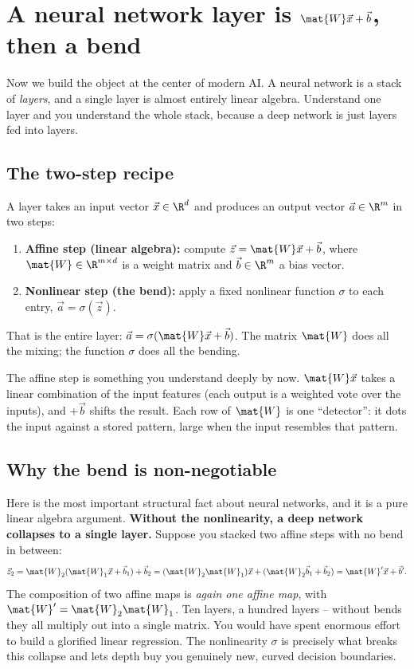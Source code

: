 \section{A neural network layer is $\mat{W}\vec{x}+\vec{b}$, then a bend}
\label{ch34:nnlayer}

Now we build the object at the center of modern AI. A neural network is a stack of
\emph{layers}, and a single layer is almost entirely linear algebra. Understand one
layer and you understand the whole stack, because a deep network is just layers fed into
layers.

\subsection{The two-step recipe}

A layer takes an input vector $\vec{x}\in\R^{d}$ and produces an output vector
$\vec{a}\in\R^{m}$ in two steps:
\begin{enumerate}
  \item \textbf{Affine step (linear algebra):} compute $\vec{z} = \mat{W}\vec{x} +
  \vec{b}$, where $\mat{W}\in\R^{m\times d}$ is a weight matrix and $\vec{b}\in\R^{m}$ a
  bias vector.
  \item \textbf{Nonlinear step (the bend):} apply a fixed nonlinear function $\sigma$ to
  each entry, $\vec{a} = \sigma(\vec{z})$.
\end{enumerate}
That is the entire layer: $\vec{a} = \sigma(\mat{W}\vec{x}+\vec{b})$. The matrix $\mat{W}$
does all the mixing; the function $\sigma$ does all the bending.

The affine step is something you understand deeply by now. $\mat{W}\vec{x}$ takes a
linear combination of the input features (each output is a weighted vote over the inputs),
and $+\vec{b}$ shifts the result. Each row of $\mat{W}$ is one ``detector'': it dots the
input against a stored pattern, large when the input resembles that pattern.

\subsection{Why the bend is non-negotiable}

Here is the most important structural fact about neural networks, and it is a pure linear
algebra argument. \textbf{Without the nonlinearity, a deep network collapses to a single
layer.} Suppose you stacked two affine steps with no bend in between:
\[
\vec{z}_2 = \mat{W}_2(\mat{W}_1 \vec{x} + \vec{b}_1) + \vec{b}_2
= (\mat{W}_2\mat{W}_1)\vec{x} + (\mat{W}_2\vec{b}_1 + \vec{b}_2)
= \mat{W}'\vec{x} + \vec{b}'.
\]
The composition of two affine maps is \emph{again one affine map}, with
$\mat{W}'=\mat{W}_2\mat{W}_1$. Ten layers, a hundred layers -- without bends they all
multiply out into a single matrix. You would have spent enormous effort to build a glorified
linear regression. The nonlinearity $\sigma$ is precisely what breaks this collapse and
lets depth buy you genuinely new, curved decision boundaries.

